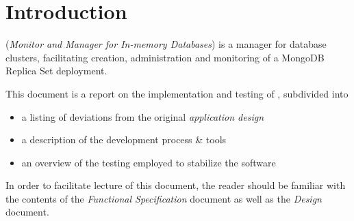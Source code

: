\section{Introduction}

\mamid (\emph{Monitor and Manager for In-memory Databases}) is a manager for database clusters, facilitating creation,
administration and monitoring of a MongoDB Replica Set deployment.

This document is a report on the implementation and testing of \mamid, subdivided into

\begin{itemize}
        \item a listing of deviations from the original \emph{application design}
        \item a description of the development process \& tools
        \item an overview of the testing employed to stabilize the software %
\end{itemize}

In order to facilitate lecture of this document, the reader should be familiar with the contents of the \emph{Functional Specification}
document as well as the \emph{Design} document.

